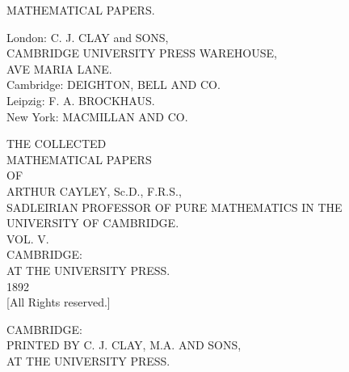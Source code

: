 \documentclass[11pt,a4paper]{article}
\begin{document}
\thispagestyle{empty}
\begin{center}
\vspace*{2in}
{\LARGE MATHEMATICAL PAPERS.}
\end{center}
\clearpage

\thispagestyle{empty}
\mbox{}
\clearpage
\thispagestyle{empty}
\mbox{}
\clearpage
\thispagestyle{empty}
\mbox{}
\clearpage

\thispagestyle{empty}
\begin{center}
\vspace*{2in}
London: C. J. CLAY and SONS,\\[0.5em]
CAMBRIDGE UNIVERSITY PRESS WAREHOUSE,\\[0.5em]
AVE MARIA LANE.\\[1em]
Cambridge: DEIGHTON, BELL AND CO.\\[0.5em]
Leipzig: F. A. BROCKHAUS.\\[0.5em]
New York: MACMILLAN AND CO.
\end{center}
\clearpage

\thispagestyle{empty}
\begin{center}
\vspace*{1.5in}
{\Huge THE COLLECTED}\\[0.5em]
{\Huge MATHEMATICAL PAPERS}\\[1em]
{\Large OF}\\[1em]
{\LARGE ARTHUR CAYLEY, Sc.D., F.R.S.,}\\[0.5em]
{\small SADLEIRIAN PROFESSOR OF PURE MATHEMATICS IN THE UNIVERSITY OF CAMBRIDGE.}\\[2em]
{\LARGE VOL. V.}\\[2em]
\vfill
{\large CAMBRIDGE:}\\[0.5em]
{\large AT THE UNIVERSITY PRESS.}\\[1em]
{\large 1892}\\[0.5em]
{\small [All Rights reserved.]}
\end{center}
\clearpage

\thispagestyle{empty}
\begin{center}
\vspace*{3in}
CAMBRIDGE:\\[0.5em]
PRINTED BY C. J. CLAY, M.A. AND SONS,\\[0.5em]
AT THE UNIVERSITY PRESS.
\end{center}
\clearpage
\end{document}
